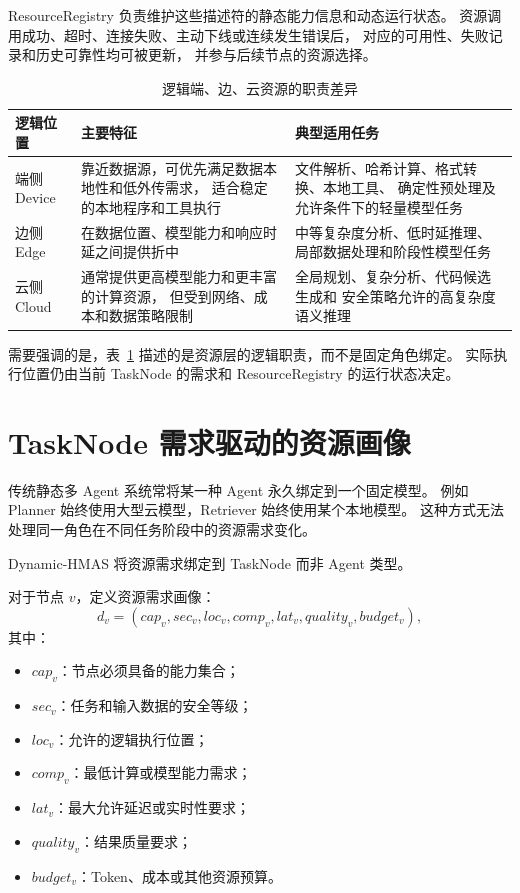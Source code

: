 \documentclass[UTF8,a4paper,12pt,oneside]{ctexbook}
\begin{document}
ResourceRegistry 负责维护这些描述符的静态能力信息和动态运行状态。
资源调用成功、超时、连接失败、主动下线或连续发生错误后，
对应的可用性、失败记录和历史可靠性均可被更新，
并参与后续节点的资源选择。

\begin{table}[htbp]
\centering
\caption{逻辑端、边、云资源的职责差异}
\label{tab:logical-device-edge-cloud}
\begin{tabularx}{0.96\textwidth}{p{}X X}
\toprule
逻辑位置 & 主要特征 & 典型适用任务\\
\midrule

端侧 Device
&
靠近数据源，可优先满足数据本地性和低外传需求，
适合稳定的本地程序和工具执行
&
文件解析、哈希计算、格式转换、本地工具、
确定性预处理及允许条件下的轻量模型任务
\\

边侧 Edge
&
在数据位置、模型能力和响应时延之间提供折中
&
中等复杂度分析、低时延推理、
局部数据处理和阶段性模型任务
\\

云侧 Cloud
&
通常提供更高模型能力和更丰富的计算资源，
但受到网络、成本和数据策略限制
&
全局规划、复杂分析、代码候选生成和
安全策略允许的高复杂度语义推理
\\

\bottomrule
\end{tabularx}
\end{table}

需要强调的是，表~\ref{tab:logical-device-edge-cloud}
描述的是资源层的逻辑职责，而不是固定角色绑定。
实际执行位置仍由当前 TaskNode 的需求和 ResourceRegistry 的运行状态决定。


\section{TaskNode 需求驱动的资源画像}

传统静态多 Agent 系统常将某一种 Agent 永久绑定到一个固定模型。
例如 Planner 始终使用大型云模型，Retriever 始终使用某个本地模型。
这种方式无法处理同一角色在不同任务阶段中的资源需求变化。

Dynamic-HMAS 将资源需求绑定到 TaskNode 而非 Agent 类型。

对于节点 $v$，定义资源需求画像：
\[
d_v=
(
cap_v,
sec_v,
loc_v,
comp_v,
lat_v,
quality_v,
budget_v
),
\]
其中：

\begin{itemize}
    \item $cap_v$：节点必须具备的能力集合；
    \item $sec_v$：任务和输入数据的安全等级；
    \item $loc_v$：允许的逻辑执行位置；
    \item $comp_v$：最低计算或模型能力需求；
    \item $lat_v$：最大允许延迟或实时性要求；
    \item $quality_v$：结果质量要求；
    \item $budget_v$：Token、成本或其他资源预算。
\end{itemize}
\end{document}
